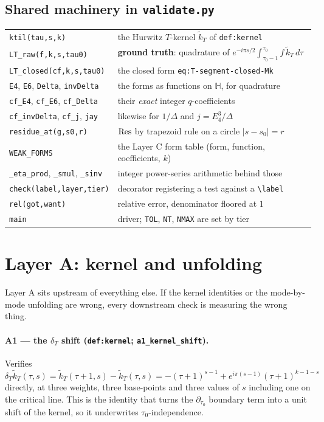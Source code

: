 \documentclass[11pt]{article}
\newcommand{\HH}{\mathbb{H}}
\newcommand{\tk}{\widetilde{k}_T}
\newcommand{\code}[1]{\texttt{#1}}
\begin{document}
\subsection*{Shared machinery in \code{validate.py}}

\noindent\begin{tabular}{@{}ll@{}}
\code{ktil(tau,s,k)} & the Hurwitz $T$-kernel $\tk$ of \code{def:kernel}\\
\code{LT\_raw(f,k,s,tau0)} & \textbf{ground truth}: quadrature of
   $e^{-i\pi s/2}\!\int_{\tau_0-1}^{\tau_0}\! f\,\tk\,d\tau$\\
\code{LT\_closed(cf,k,s,tau0)} & the closed form \code{eq:T-segment-closed-Mk}\\
\code{E4}, \code{E6}, \code{Delta}, \code{invDelta} & the forms as functions on $\HH$, for quadrature\\
\code{cf\_E4}, \code{cf\_E6}, \code{cf\_Delta} & their \emph{exact} integer $q$-coefficients\\
\code{cf\_invDelta}, \code{cf\_j}, \code{jay} & likewise for $1/\Delta$ and $j=E_4^3/\Delta$\\
\code{residue\_at(g,s0,r)} & $\mathop{\rm Res}$ by trapezoid rule on a circle $|s-s_0|=r$\\
\code{WEAK\_FORMS} & the Layer C form table (form, function, coefficients, $k$)\\
\code{\_eta\_prod}, \code{\_smul}, \code{\_sinv} & integer power-series arithmetic behind those\\
\code{check(label,layer,tier)} & decorator registering a test against a \verb|\label|\\
\code{rel(got,want)} & relative error, denominator floored at $1$\\
\code{main} & driver; \code{TOL}, \code{NT}, \code{NMAX} are set by tier\\
\end{tabular}

\section{Layer A: kernel and unfolding}

Layer A sits upstream of everything else. If the kernel identities or the mode-by-mode
unfolding are wrong, every downstream check is measuring the wrong thing.

\paragraph{A1 --- the $\delta_T$ shift (\code{def:kernel}; \code{a1\_kernel\_shift}).}
Verifies
$\delta_T\tk(\tau,s)=\tk(\tau+1,s)-\tk(\tau,s)=-(\tau+1)^{s-1}+e^{i\pi(s-1)}(\tau+1)^{k-1-s}$
directly, at three weights, three base-points and three values of $s$ including one on the
critical line. This is the identity that turns the $\partial_{\tau_0}$ boundary term into a unit
shift of the kernel, so it underwrites $\tau_0$-independence.
\end{document}
